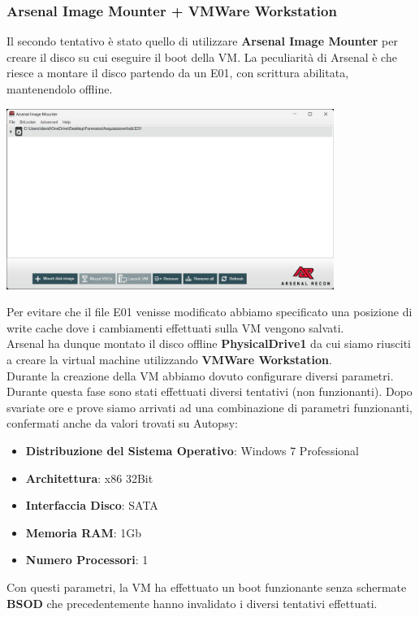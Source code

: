 \subsubsection{Arsenal Image Mounter + VMWare Workstation}
Il secondo tentativo è stato quello di utilizzare \textbf{Arsenal Image Mounter} per creare il disco su cui eseguire il boot della VM. La peculiarità di Arsenal è che riesce a montare il disco partendo da un E01, con scrittura abilitata, mantenendolo offline.
\begin{center}
    \includegraphics[width=0.8\textwidth]{img/arsenal-imager.png}
\end{center}
Per evitare che il file E01 venisse modificato abbiamo specificato una posizione di write cache dove i cambiamenti effettuati sulla VM vengono salvati.\\
Arsenal ha dunque montato il disco offline \textbf{PhysicalDrive1} da cui siamo riusciti a creare la virtual machine utilizzando \textbf{VMWare Workstation}.\vspace{14pt}\\
Durante la creazione della VM abbiamo dovuto configurare diversi parametri. Durante questa fase sono stati effettuati diversi tentativi (non funzionanti). Dopo svariate ore e prove siamo arrivati ad una combinazione di parametri funzionanti, confermati anche da valori trovati su Autopsy:
\begin{itemize}
    \item \textbf{Distribuzione del Sistema Operativo}: Windows 7 Professional
    \item \textbf{Architettura}: x86 32Bit
    \item \textbf{Interfaccia Disco}: SATA
    \item \textbf{Memoria RAM}: 1Gb
    \item \textbf{Numero Processori}: 1 
\end{itemize}
Con questi parametri, la VM ha effettuato un boot funzionante senza schermate \textbf{BSOD} che precedentemente hanno invalidato i diversi tentativi effettuati.
